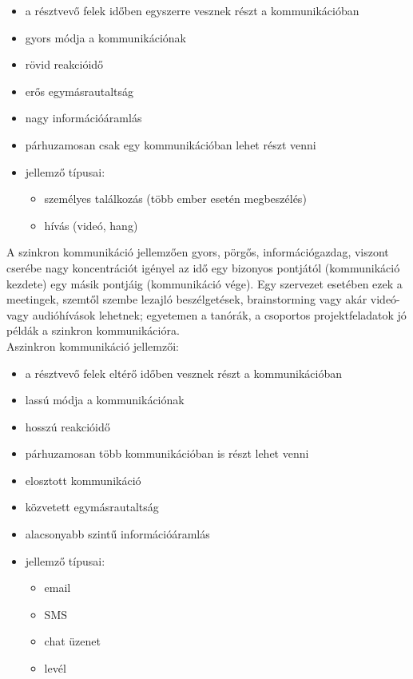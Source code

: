 \begin{itemize}
  \item a résztvevő felek időben egyszerre vesznek részt a kommunikációban
  \item gyors módja a kommunikációnak
  \item rövid reakcióidő
  \item erős egymásrautaltság
  \item nagy információáramlás
  \item párhuzamosan csak egy kommunikációban lehet részt venni
  \item jellemző típusai:
  \begin{itemize}
    \item személyes találkozás (több ember esetén megbeszélés)
    \item hívás (videó, hang)
  \end{itemize}
\end{itemize}
A szinkron kommunikáció jellemzően gyors, pörgős, információgazdag, viszont cserébe nagy koncentrációt igényel az idő egy bizonyos pontjától (kommunikáció kezdete) egy másik pontjáig (kommunikáció vége). Egy szervezet esetében ezek a meetingek, szemtől szembe lezajló beszélgetések, brainstorming vagy akár videó- vagy audióhívások lehetnek; egyetemen a tanórák, a csoportos projektfeladatok jó példák a szinkron kommunikációra.\\
\newline
Aszinkron kommunikáció jellemzői:
\begin{itemize}
  \item a résztvevő felek eltérő időben vesznek részt a kommunikációban
  \item lassú módja a kommunikációnak
  \item hosszú reakcióidő
  \item párhuzamosan több kommunikációban is részt lehet venni
  \item elosztott kommunikáció
  \item közvetett egymásrautaltság
  \item alacsonyabb szintű információáramlás
  \item jellemző típusai:
  \begin{itemize}
    \item email
    \item SMS
    \item chat üzenet
    \item levél
  \end{itemize}
\end{itemize}


